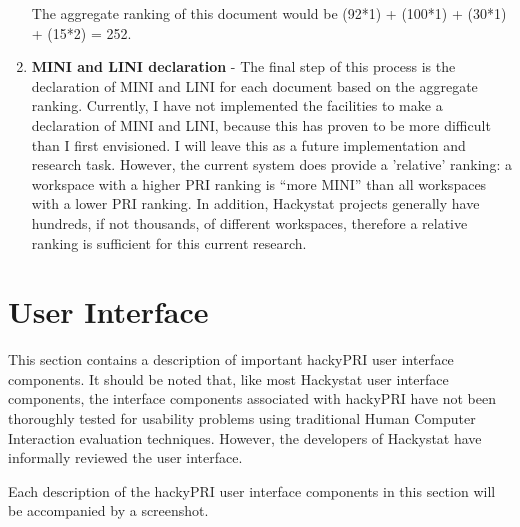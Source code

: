 \begin{enumerate}
  The aggregate ranking of this document would be (92*1) + (100*1) + (30*1)
  + (15*2) = 252.
\item \textbf{MINI and LINI declaration} - The final step of this process
  is the declaration of MINI and LINI for each document based on the
  aggregate ranking. Currently, I have not implemented the facilities to
  make a declaration of MINI and LINI, because this has proven to be more
  difficult than I first envisioned. I will leave this as a future
  implementation and research task. However, the current system does
  provide a 'relative' ranking: a workspace with a higher PRI ranking is
  ``more MINI'' than all workspaces with a lower PRI ranking. In addition,
  Hackystat projects generally have hundreds, if not thousands, of
  different workspaces, therefore a relative ranking is sufficient for this
  current research.
\end{enumerate}




\section{User Interface}
\label{section:userinterface}
This section contains a description of important hackyPRI user interface
components. It should be noted that, like most Hackystat user interface
components, the interface components associated with hackyPRI have not been
thoroughly tested for usability problems using traditional Human Computer
Interaction evaluation techniques. However, the developers of Hackystat
have informally reviewed the user interface.

Each description of the hackyPRI user interface components in this section
will be accompanied by a screenshot.

\clearpage
